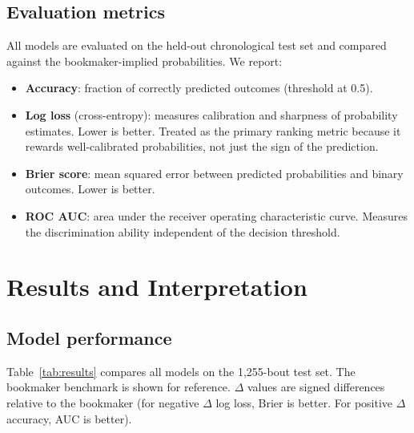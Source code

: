 \documentclass{article}
\begin{document}
\subsection{Evaluation metrics}

All models are evaluated on the held-out chronological test set and compared
against the bookmaker-implied probabilities.
We report:
\begin{itemize}
  \item \textbf{Accuracy}: fraction of correctly predicted outcomes
  (threshold at 0.5).
  \item \textbf{Log loss} (cross-entropy): measures calibration and
  sharpness of probability estimates. Lower is better.
  Treated as the primary ranking metric because it rewards well-calibrated
  probabilities, not just the sign of the prediction.
  \item \textbf{Brier score}: mean squared error between predicted
  probabilities and binary outcomes. Lower is better.
  \item \textbf{ROC AUC}: area under the receiver operating characteristic
  curve. Measures the discrimination ability independent of the decision
  threshold.
\end{itemize}

\section{Results and Interpretation}
\label{sec:results}

\subsection{Model performance}

Table~\ref{tab:results} compares all models on the 1{,}255-bout test set.
The bookmaker benchmark is shown for reference. $\Delta$ values are
signed differences relative to the bookmaker (for negative $\Delta$ log
loss, Brier is better. For positive $\Delta$ accuracy, AUC is better).
\end{document}
